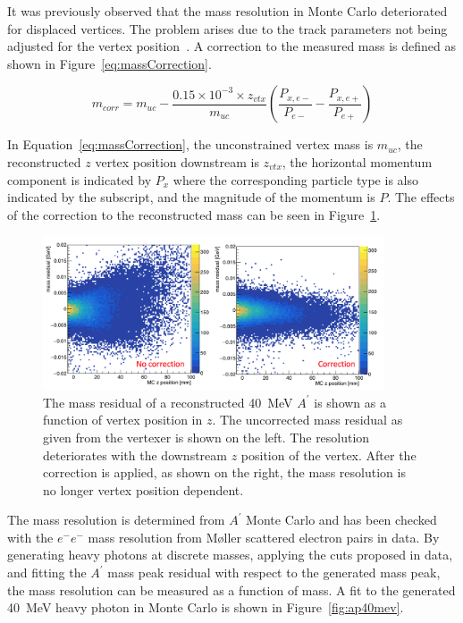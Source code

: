 It was previously observed that the mass resolution in Monte Carlo deteriorated for displaced vertices. The problem arises due to the track parameters not being adjusted for the vertex position~\cite{billoir_fast_1992}. A correction to the measured mass is defined as shown in Figure~\ref{eq:massCorrection}.

\begin{equation}
\label{eq:massCorrection}
m_{corr} = m_{uc} - \dfrac{0.15\times 10^{-3}\times z_{vtx}}{m_{uc}}(\dfrac{P_{x,e-}}{P_{e-}}-\dfrac{P_{x,e+}}{P_{e+}})            
\end{equation}

In Equation~\eqref{eq:massCorrection}, the unconstrained vertex mass is $m_{uc}$, the reconstructed $z$ vertex position downstream is $z_{vtx}$, the horizontal momentum component is indicated by $P_x$ where the corresponding particle type is also indicated by the subscript, and the magnitude of the momentum is $P$. The effects of the correction to the reconstructed mass can be seen in Figure~\ref{fig:effectMCorr}.

\begin{figure}[htb]
  \centering
      \includegraphics[width=0.9\textwidth]{pics/searching/massCorrection.png}
  \caption[Correction to the reconstructed mass for a 40~MeV $A^{\prime}$]{The mass residual of a reconstructed 40~MeV $A^{\prime}$ is shown as a function of vertex position in $z$. The uncorrected mass residual as given from the vertexer is shown on the left. The resolution deteriorates with the downstream $z$ position of the vertex. After the correction is applied, as shown on the right, the mass resolution is no longer vertex position dependent.}
  \label{fig:effectMCorr}
\end{figure} 

The mass resolution is determined from $A^{\prime}$ Monte Carlo and has been checked with the $e^-e^-$ mass resolution from M\o ller scattered electron pairs in data. By generating heavy photons at discrete masses, applying the cuts proposed in data, and fitting the $A^{\prime}$ mass peak residual with respect to the generated mass peak, the mass resolution can be measured as a function of mass. A fit to the generated 40~MeV heavy photon in Monte Carlo is shown in Figure~\ref{fig:ap40mev}.

